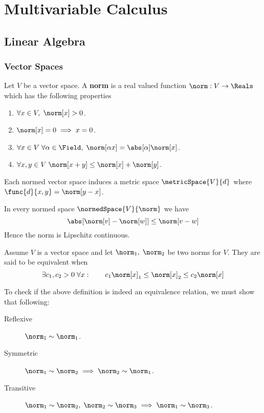 \chapter{Multivariable Calculus}
\thispagestyle{headings}
\section{Linear Algebra}
\subsection{Vector Spaces}

\begin{definition}
    Let \(V\) be a vector space. A \textbf{norm} is a real valued function \(\norm: V \to \Reals\) which has the following properties
    \begin{enumerate}
        \item \(\forall x \in V, \; \norm[x] > 0\).
        \item \(\norm[x] = 0 \implies x = 0\).
        \item \(\forall x \in V \; \forall \alpha \in \Field, \; \norm[\alpha x] = \abs[\alpha] \norm[x]\).
        \item \(\forall x,y \in V \; \norm[x+y] \leq \norm[x] + \norm[y]\).
    \end{enumerate}
\end{definition}

Each normed vector space induces a metric space \(\metricSpace{V}{d}\) where \(\func{d}{x,y} = \norm[y - x]\).

\begin{theorem}
    In every normed space \(\normedSpace{V}{\norm}\) we have
    \begin{equation*}
        \abs[ {\norm[v] - \norm[w]}] \leq \norm[v - w]
    \end{equation*}
    Hence the norm is Lipschitz continuous.
\end{theorem}


\begin{definition}
    Assume \(V\) is a vector space and let \(\norm_1, \; \norm_2\) be two norms for \(V\). They are said to be equivalent when
    \begin{equation*}
        \exists c_1,c_2 > 0 \; \forall x : \qquad c_1 \norm[x]_1 \leq \norm[x]_2 \leq c_2 \norm[x]
    \end{equation*}
\end{definition}

To check if the above definition is indeed an equivalence relation, we must show that following:
\begin{description}
    \item [Reflexive] \(\norm_1 \sim \norm_1\).
    \item [Symmetric] \(\norm_1 \sim \norm_2 \implies \norm_2 \sim \norm_1\).
    \item [Transitive] \( \norm_1 \sim \norm_2 , \; \norm_2 \sim \norm_3 \implies \norm_1 \sim \norm_3\).
\end{description}

